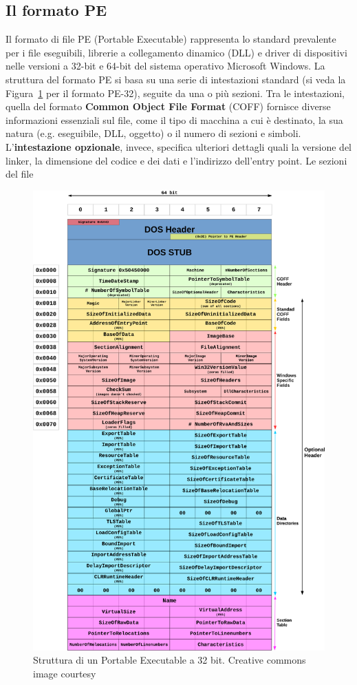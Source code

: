 \subsection{Il formato PE}\label{subsec:pe_format}
Il formato di file PE (Portable Executable) \cite{pe} rappresenta lo standard prevalente per i file eseguibili, librerie a collegamento dinamico (DLL) e driver di dispositivi  nelle versioni a 32-bit e 64-bit del sistema operativo Microsoft Windows.  La struttura del formato PE si basa su una serie di intestazioni standard (si veda la Figura~\ref{fig:pe_header} per il formato PE-32), seguite da una o più sezioni. Tra le intestazioni, quella del formato \textbf{Common Object File Format} (COFF) fornisce diverse informazioni essenziali sul file, come il tipo di macchina a cui è destinato, la sua natura (e.g. eseguibile, DLL, oggetto) o il numero di sezioni e simboli. L'\textbf{intestazione opzionale}, invece, specifica ulteriori dettagli quali la versione del linker, la dimensione del codice e dei dati e l'indirizzo dell'entry point.
Le sezioni del file
 \begin{figure}[H]
	\centering
	\includegraphics[width=\columnwidth]{fig/pe_format.png}
	\caption{Struttura di un Portable Executable a 32 bit. Creative commons image courtesy \cite{pe_header}}
	\label{fig:pe_header}
\end{figure}
